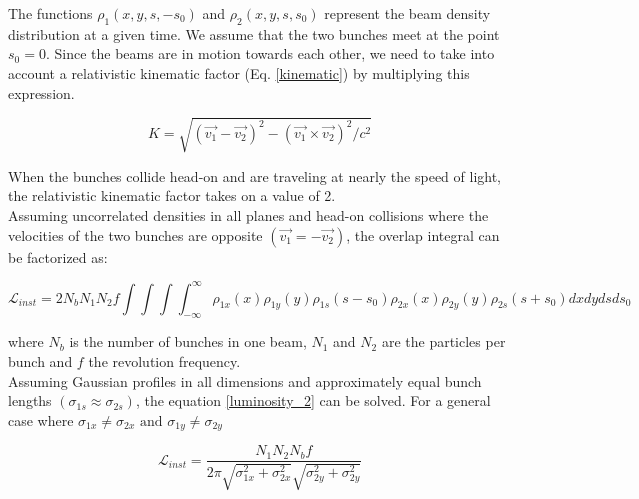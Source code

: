 The functions $\rho_{1}(x,y,s,-s_{0})$ and $\rho_{2}(x,y,s,s_{0})$ represent the beam density distribution at a given time. We assume that the two bunches meet at the point $s_{0} = 0$. Since the beams are in motion towards each other, we need to take into account a relativistic kinematic factor (Eq. \ref{kinematic}) by multiplying this expression.

\begin{equation}
 K = \sqrt{(\vec{v_{1}}-\vec{v_{2}})^{2}-(\vec{v_{1}}\times \vec{v_{2}})^{2}/c^{2}}
    \label{kinematic}
\end{equation}

When the bunches collide head-on and are traveling at nearly the speed of light, the relativistic kinematic factor takes on a value of 2.\\
Assuming uncorrelated densities in all planes and head-on collisions where the velocities of the two bunches are opposite $(\vec{v_{1}}=-\vec{v_{2}})$, the overlap integral can be factorized as:

\begin{equation}
  \mathcal{L}_{inst}= 2N_{b} N_{1}N_{2}f \int\int\int\int_{-\infty}^{\infty}  \rho_{1x}(x)\rho_{1y}(y)\rho_{1s}(s-s_{0})\rho_{2x}(x)\rho_{2y}(y)\rho_{2s}(s+s_{0}) dxdydsds_{0}
    \label{luminosity_2}
\end{equation}

where $N_{b}$ is the number of bunches in one beam, $N_{1}$ and $N_{2}$ are the particles per bunch and $f$ the revolution frequency.\\





Assuming Gaussian profiles in all dimensions and approximately equal bunch lengths $(\sigma_{1s}\approx \sigma_{2s})$, the equation \ref{luminosity_2} can be solved.
For a general case where $\sigma_{1x}\neq \sigma_{2x} \text{ and } \sigma_{1y}\neq \sigma_{2y}$

\begin{equation}
  \mathcal{L}_{inst}= \frac{N_{1} N_{2} N_{b}f }{2\pi \sqrt{\sigma_{1x}^{2}+\sigma_{2x}^{2}}\sqrt{\sigma_{2y}^{2}+\sigma_{2y}^{2}}}
  \label{lumi_general}
\end{equation}

